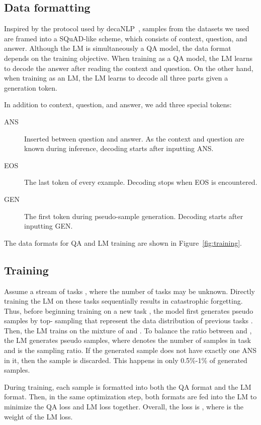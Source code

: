 \documentclass{article} \usepackage{iclr2020_conference,times}
\begin{document}
\subsection{Data formatting} \label{subsec:data_format}




Inspired by the protocol used by decaNLP~\citep{McCann2018decaNLP}, samples from the datasets we used are framed into a SQuAD-like scheme, which consists of context, question, and answer.
Although the LM is simultaneously a QA model, 
the data format depends on the training objective.  When training as a QA model, the LM learns to decode the answer after reading the context and question.
On the other hand, when training as an LM, the LM learns to decode all three parts given a generation token.

In addition to context, question, and answer, we add three special tokens:
\begin{description}
    \item[ANS] Inserted between question and answer. As the context and question are known during inference, decoding starts after inputting ANS.
    \item[EOS] The last token of every example. Decoding stops when EOS is encountered.
    \item[GEN] The first token during pseudo-sample generation. Decoding starts after inputting GEN.
\end{description}
The data formats for QA and LM training are shown in Figure~\ref{fig:training}.





\subsection{Training}
Assume a stream of tasks , where the number of tasks may be unknown.
Directly training the LM on these tasks sequentially results in catastrophic forgetting.
Thus, before beginning training on a new task , the model first generates pseudo samples  
by top- sampling that represent the data distribution 
of previous tasks .
Then, the LM trains on the mixture of  and .
To balance the ratio between  and , the LM generates  pseudo samples, where  denotes the number of samples in task  and  is the sampling ratio.
If the generated sample does not have exactly one ANS in it, then the sample is discarded.
This happens in only 0.5\%-1\% of generated samples.

During training, each sample is formatted into both the QA format and the LM format.
Then, in the same optimization step, both formats are fed into the LM to minimize the QA loss  and LM loss  together. Overall, the loss is , where  is the weight of the LM loss.
\end{document}
